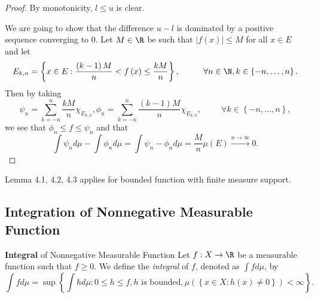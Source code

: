 \documentclass[stat901]{subfiles}
\begin{document}
    \begin{proof}
        By monotonicity, $l\leq u$ is clear.

        We are going to show that the difference $u-l$ is dominated by a positive sequence converging to $0$. Let $M\in\R$ be such that $\left| f\left( x \right) \right|\leq M$ for all $x\in E$ and let
        \begin{equation*}
            E_{k,n} = \left\lbrace x\in E: \frac{\left( k-1 \right)M}{n}< f\left( x \right)\leq \frac{kM}{n} \right\rbrace, \hspace{1cm}\forall n\in\N, k\in\left\lbrace -n,\ldots,n \right\rbrace.
        \end{equation*}
        Then by taking
        \begin{equation*}
            \psi_n = \sum^{n}_{k=-n} \frac{kM}{n}\chi_{E_{k,n}}, \phi_n = \sum^{n}_{k=-n} \frac{\left( k-1 \right)M}{n}\chi_{E_{k,n}}, \hspace{1cm}\forall k\in\left\lbrace -n,\ldots,n \right\rbrace,
        \end{equation*}
        we see that $\phi_n\leq f\leq\psi_n$ and that
        \begin{equation*}
            \int\psi_nd\mu-\int\phi_nd\mu = \int\psi_n-\phi_nd\mu = \frac{M}{n}\mu\left( E \right) \overset{n\to\infty}{\to} 0.
        \end{equation*}
    \end{proof}

    \clearpage

    \begin{lemma}{}
        Lemma 4.1, 4.2, 4.3 applies for bounded function with finite measure support.
    \end{lemma}

    \rruleline

    \subsection{Integration of Nonnegative Measurable Function}
    
    \begin{definition}{\textbf{Integral} of Nonnegative Measurable Function}
        Let $f:X\to\R$ be a measurable function such that $f\geq 0$. We define the \emph{integral} of $f$, denoted as $\int fd\mu$, by
        \begin{equation*}
            \int fd\mu = \sup\left\lbrace \int hd\mu: 0\leq h\leq f, h\text{ is bounded}, \mu\left( \left\lbrace x\in X: h\left( x \right)\neq 0 \right\rbrace \right) < \infty \right\rbrace.
        \end{equation*}
    \end{definition}
\end{document}
